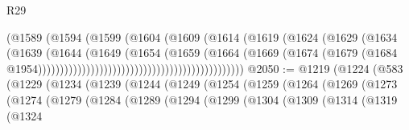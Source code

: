 \begin{lexlean}{R29}
\begin{coremodule}
                                                          (@1589
                                                            (@1594
                                                              (@1599
                                                                (@1604
                                                                  (@1609
                                                                    (@1614
                                                                      (@1619
                                                                        (@1624
                                                                          (@1629
                                                                            (@1634
                                                                              (@1639
                                                                                (@1644
                                                                                  (@1649
                                                                                    (@1654
                                                                                      (@1659
                                                                                        (@1664
                                                                                          (@1669
                                                                                            (@1674
                                                                                              (@1679
                                                                                                (@1684
                                                                                                  @1954)))))))))))))))))))))))))))))))))))))))))))))))
@2050 := @1219
    (@1224
      (@583
        (@1229
          (@1234
            (@1239
              (@1244
                (@1249
                  (@1254
                    (@1259
                      (@1264
                        (@1269
                          (@1273
                            (@1274
                              (@1279
                                (@1284
                                  (@1289
                                    (@1294
                                      (@1299
                                        (@1304
                                          (@1309
                                            (@1314
                                              (@1319
                                                (@1324

\end{coremodule}
\end{lexlean}
